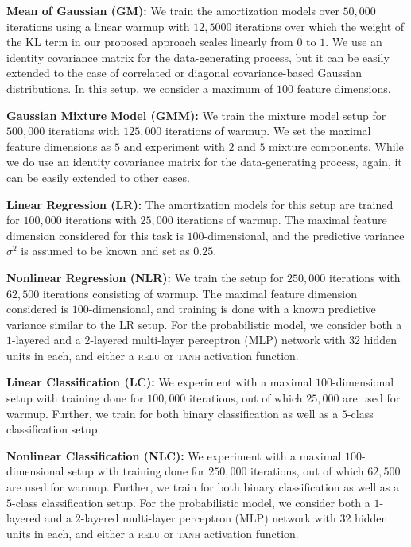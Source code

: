 \textbf{Mean of Gaussian (GM):} We train the amortization models over $50,000$ iterations using a linear warmup with $12,5000$ iterations over which the weight of the KL term in our proposed approach scales linearly from $0$ to $1$. We use an identity covariance matrix for the data-generating process, but it can be easily extended to the case of correlated or diagonal covariance-based Gaussian distributions. In this setup, we consider a maximum of $100$ feature dimensions.

\textbf{Gaussian Mixture Model (GMM):} We train the mixture model setup for $500,000$ iterations with $125,000$ iterations of warmup. We set the maximal feature dimensions as $5$ and experiment with $2$ and $5$ mixture components. While we do use an identity covariance matrix for the data-generating process, again, it can be easily extended to other cases.

\textbf{Linear Regression (LR):} The amortization models for this setup are trained for $100,000$ iterations with $25,000$ iterations of warmup. The maximal feature dimension considered for this task is $100$-dimensional, and the predictive variance $\sigma^2$ is assumed to be known and set as $0.25$.

\textbf{Nonlinear Regression (NLR):} We train the setup for $250,000$ iterations with $62,500$ iterations consisting of warmup. The maximal feature dimension considered is $100$-dimensional, and training is done with a known predictive variance similar to the LR setup. For the probabilistic model, we consider both a $1$-layered and a $2$-layered multi-layer perceptron (MLP) network with 32 hidden units in each, and either a \textsc{relu} or \textsc{tanh} activation function.

\textbf{Linear Classification (LC):} We experiment with a maximal $100$-dimensional setup with training done for $100,000$ iterations, out of which $25,000$ are used for warmup. Further, we train for both binary classification as well as a $5$-class classification setup.

\textbf{Nonlinear Classification (NLC):} We experiment with a maximal $100$-dimensional setup with training done for $250,000$ iterations, out of which $62,500$ are used for warmup. Further, we train for both binary classification as well as a $5$-class classification setup. For the probabilistic model, we consider both a $1$-layered and a $2$-layered multi-layer perceptron (MLP) network with 32 hidden units in each, and either a \textsc{relu} or \textsc{tanh} activation function.

